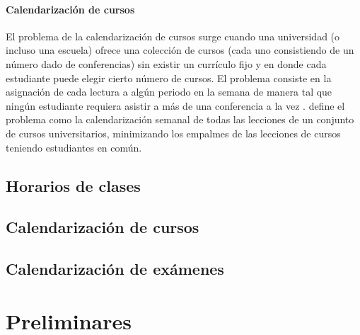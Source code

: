 \documentclass[draft,12pt,headsepline,footsepline,paper=letter]{scrreprt}
\begin{document}
\subsubsection{Calendarización de cursos}

El problema de la calendarización de cursos surge cuando una universidad (o incluso una escuela) ofrece una colección de cursos (cada uno consistiendo de un número dado de conferencias) sin existir un currículo fijo y en donde cada estudiante puede elegir cierto número de cursos. El problema consiste en la asignación de cada lectura a algún periodo en la semana de manera tal que ningún estudiante requiera asistir a más de una conferencia a la vez \citep[p.~157]{werra85an-introduction-to-timetabling}. 
\citet[p.~88]{schaerf99a-survey-of-automated} define el problema como la calendarización semanal de todas las lecciones de un conjunto de cursos universitarios, minimizando los empalmes de las lecciones de cursos teniendo estudiantes en común.

\section{Horarios de clases}

\section{Calendarización de cursos}

\section{Calendarización de exámenes}

\chapter{Preliminares}
\end{document}
